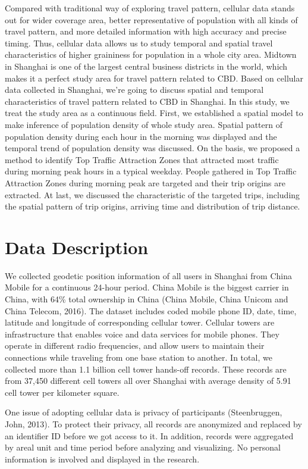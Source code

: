 \documentclass[hidelinks,12pt]{article}
\begin{document}
	Compared with traditional way of exploring travel pattern, cellular data stands out for wider coverage area, better representative of population with all kinds of travel pattern, and more detailed information with high accuracy and precise timing. Thus, cellular data allows us to study temporal and spatial travel characteristics of higher graininess for population in a whole city area. Midtown in Shanghai is one of the largest central business districts in the world, which makes it a perfect study area for travel pattern related to CBD. Based on cellular data collected in Shanghai, we’re going to discuss spatial and temporal characteristics of travel pattern related to CBD in Shanghai. In this study, we treat the study area as a continuous field. First, we established a spatial model to make inference of population density of whole study area. Spatial pattern of population density during each hour in the morning was displayed and the temporal trend of population density was discussed. On the basis, we proposed a method to identify Top Traffic Attraction Zones that attracted most traffic during morning peak hours in a typical weekday. People gathered in Top Traffic Attraction Zones during morning peak are targeted and their trip origins are extracted. At last, we discussed the characteristic of the targeted trips, including the spatial pattern of trip origins, arriving time and distribution of trip distance.
	
	\section{Data Description}\label{sec:data}
	We collected geodetic position information of all users in Shanghai from China Mobile for a continuous 24-hour period. China Mobile is the biggest carrier in China, with 64\% total ownership in China (China Mobile, China Unicom and China Telecom, 2016). The dataset includes coded mobile phone ID, date, time, latitude and longitude of corresponding cellular tower. Cellular towers are infrastructure that enables voice and data services for mobile phones. They operate in different radio frequencies, and allow users to maintain their connections while traveling from one base station to another. In total, we collected more than 1.1 billion cell tower hands-off records. These records are from 37,450 different cell towers all over Shanghai with average density of 5.91 cell tower per kilometer square.
	
	One issue of adopting cellular data is privacy of participants (Steenbruggen, John, 2013). To protect their privacy, all records are anonymized and replaced by an identifier ID before we got access to it. In addition, records were aggregated by areal unit and time period before analyzing and visualizing. No personal information is involved and displayed in the research.
	
\end{document}
